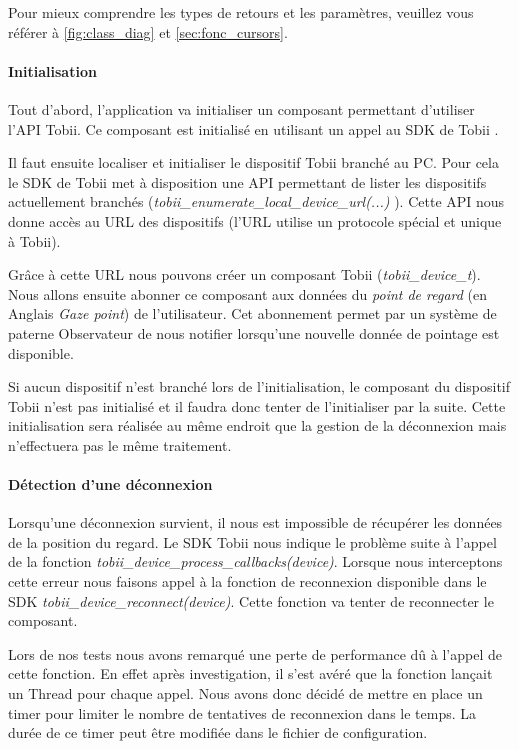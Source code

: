\documentclass{polytech/polytech}
\begin{document}
\pagebreak
Pour mieux comprendre les types de retours et les paramètres, veuillez vous référer à \autoref{fig:class_diag} et \autoref{sec:fonc_cursors}.

\paragraph{Initialisation}
Tout d'abord, l'application va initialiser un composant permettant d'utiliser l'API Tobii. Ce composant est initialisé en utilisant un appel au SDK de Tobii \cite{tobiiApi}. 

Il faut ensuite localiser et initialiser le dispositif Tobii branché au PC. Pour cela le SDK de Tobii met à disposition une API permettant de lister les dispositifs actuellement branchés (\textit{tobii\_enumerate\_local\_device\_url(...)} ). Cette API nous donne accès au URL des dispositifs (l'URL utilise un protocole spécial et unique à Tobii). 

Grâce à cette URL nous pouvons créer un composant Tobii (\textit{tobii\_device\_t}). Nous allons ensuite abonner ce composant aux données du \textit{point de regard} (en Anglais \textit{Gaze point}) de l'utilisateur. Cet abonnement permet par un système de paterne Observateur de nous notifier lorsqu'une nouvelle donnée de pointage est disponible.

Si aucun dispositif n'est branché lors de l'initialisation, le composant du dispositif Tobii n'est pas initialisé et il faudra donc tenter de l'initialiser par la suite. Cette initialisation sera réalisée au même endroit que la gestion de la déconnexion mais n'effectuera pas le même traitement.

\paragraph{Détection d'une déconnexion}
Lorsqu'une déconnexion survient, il nous est impossible de récupérer les données de la position du regard. Le SDK Tobii nous indique le problème suite à l'appel de la fonction \textit{tobii\_device\_process\_callbacks(device)}. Lorsque nous interceptons cette erreur nous faisons appel à la fonction de reconnexion disponible dans le SDK \textit{tobii\_device\_reconnect(device)}. Cette fonction va tenter de reconnecter le composant. 

Lors de nos tests nous avons remarqué une perte de performance dû à l'appel de cette fonction. En effet après investigation, il s'est avéré que la fonction lançait un Thread pour chaque appel. Nous avons donc décidé de mettre en place un timer pour limiter le nombre de tentatives de reconnexion dans le temps. La durée de ce timer peut être modifiée dans le fichier de configuration.
\end{document}
